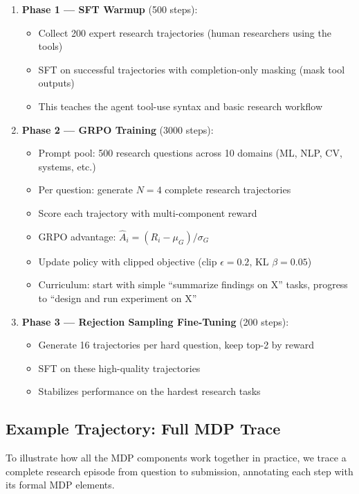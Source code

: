 \begin{enumerate}
  \item \textbf{Phase 1 --- SFT Warmup} (500 steps):

\begin{itemize}
  \item Collect 200 expert research trajectories (human researchers using the tools)
  \item SFT on successful trajectories with completion-only masking (mask tool outputs)
  \item This teaches the agent tool-use syntax and basic research workflow
\end{itemize}
  \item \textbf{Phase 2 --- GRPO Training} (3000 steps):

\begin{itemize}
  \item Prompt pool: 500 research questions across 10 domains (ML, NLP, CV, systems, etc.)
  \item Per question: generate $N=4$ complete research trajectories
  \item Score each trajectory with multi-component reward
  \item GRPO advantage: $\hat{A}_i = (R_i - \mu_G) / \sigma_G$
  \item Update policy with clipped objective (clip $\epsilon=0.2$, KL $\beta=0.05$)
  \item Curriculum: start with simple ``summarize findings on X'' tasks, progress to ``design and run experiment on X''
\end{itemize}
  \item \textbf{Phase 3 --- Rejection Sampling Fine-Tuning} (200 steps):

\begin{itemize}
  \item Generate 16 trajectories per hard question, keep top-2 by reward
  \item SFT on these high-quality trajectories
  \item Stabilizes performance on the hardest research tasks
\end{itemize}
\end{enumerate}

\subsection{Example Trajectory: Full MDP Trace}
\label{example-trajectory-full-mdp-trace}

To illustrate how all the MDP components work together in practice, we trace a complete research episode from question to submission, annotating each step with its formal MDP elements.

